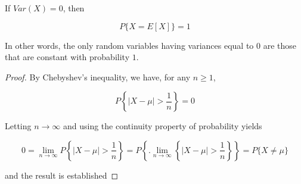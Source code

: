 \begin{prop*}
	If $Var(X) = 0$, then
	
	$$P\{X = E[X]\} = 1$$
	
	In other words, the only random variables having variances equal to $0$ are those that are constant with probability $1$.
\end{prop*}

\begin{proof}
	By Chebyshev's inequality, we have, for any $n \geq 1$,
	
	$$P\left\{ |X - \mu| > \dfrac{1}{n} \right\} = 0$$
	
	Letting $n \rightarrow \infty$ and using the continuity property of probability yields
	
	$$0 = \lim_{n \rightarrow \infty}P\left\{|X - \mu| > \dfrac{1}{n} \right\} = P \left\{.\lim_{n \rightarrow \infty} \left\{|X - \mu| > \dfrac{1}{n} \right\} \right\} = P\{X \neq \mu\}$$
	
	and the result is established
\end{proof}











